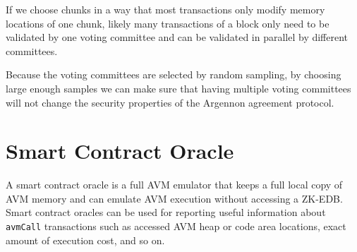\documentclass[a4paper]{report}
\begin{document}
    If we choose chunks in a way that most transactions only modify memory locations of one chunk,
    likely many transactions of a block only need to be validated by one voting committee and can be validated in
    parallel by different committees.

    Because the voting committees are selected by random sampling, by choosing large enough samples we can make sure
    that having multiple voting committees will not change the security properties of the Argennon agreement protocol.


    \section{Smart Contract Oracle}\label{sec:smart-contract-oracle}

    A smart contract oracle is a full AVM emulator that keeps a full local copy of AVM memory and can emulate AVM
    execution without accessing a ZK-EDB. Smart contract oracles can be used for reporting useful information about
    \texttt{avmCall} transactions such as accessed AVM heap or code area locations, exact amount of execution cost,
    and so on.
\end{document}

